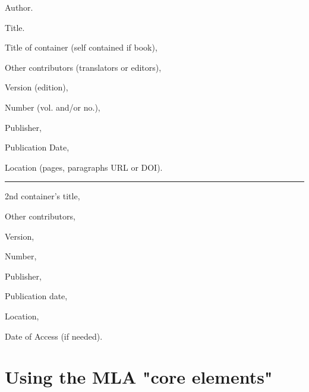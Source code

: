 \newpage

\begin{center}
\begin{tcolorbox}[colframe=oyster, coltitle=black, sharp corners, title=\ding{52} The MLA "core elements"]
\begin{itemize} 
{\small
\item Author. 

\item Title. 

\item Title of container (self contained if book), 

\item Other contributors (translators or editors), 

\item Version (edition), 

\item Number (vol. and/or no.), 

\item Publisher, 

\item Publication Date, 

\item Location (pages, paragraphs URL or DOI). 

\smallskip

\rule{8cm}{.1em}

\smallskip

\item 2nd container’s title, 

\item Other contributors, 

\item Version, 

\item Number, 

\item Publisher, 

\item Publication date, 

\item Location, 

\item Date of Access (if needed).
}
\end{itemize}

\end{tcolorbox}
\end{center}


\section{Using the MLA "core elements"}

